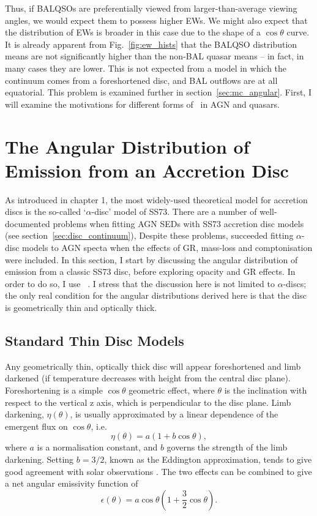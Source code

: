 Thus, if BALQSOs are preferentially viewed from larger-than-average viewing angles,
we would expect them to possess higher EWs. We might also expect that the distribution
of EWs is broader in this case due to the shape of a $\cos \theta$ curve.
It is already apparent from Fig.~\ref{fig:ew_hists} that the BALQSO distribution means 
are not significantly higher than the non-BAL quasar
means -- in fact, in many cases they are lower. 
This is not expected from a model
in which the continuum comes from a foreshortened disc, and BAL outflows are at all equatorial.
This problem is examined further in section~\ref{sec:mc_angular}. 
First, I will examine the motivations for different forms of \ept\ 
in AGN and quasars.

\section{The Angular Distribution of Emission from an Accretion Disc}
\label{sec:disc_agn}

\noindent 
As introduced in chapter 1, the most widely-used theoretical model for accretion discs
is the so-called `$\alpha$-disc' model of SS73. 
There are a number of well-documented problems when fitting 
AGN SEDs with SS73 accretion disc models (see section~\ref{sec:disc_continuum}), 
Despite these problems, \cite{capellupo2015} succeeded
fitting $\alpha$-disc models to AGN specta when the effects of
GR, mass-loss and comptonisation were included.
In this section, I start by discussing the angular distribution of
emission from a classic SS73 disc, before exploring opacity and GR 
effects. In order to do so, I use \agn\
\citep{hubeny2000,davishubeny2006,davis2007}. I stress that the 
discussion here is not limited to $\alpha$-discs; the only real condition
for the angular distributions derived here is that the 
disc is geometrically thin and optically thick.

\subsection{Standard Thin Disc Models}

\noindent
Any geometrically thin, optically thick disc will appear
foreshortened and limb darkened (if temperature decreases
with height from the central disc plane). 
Foreshortening is a simple $\cos \theta$ geometric effect, 
where $\theta$ is the inclination with respect to the vertical z axis, which
is perpendicular to the disc plane.
Limb darkening, $\eta(\theta)$, is usually approximated by a linear dependence
of the emergent flux on $\cos \theta$, i.e. 
\begin{equation}
\eta(\theta) = a \left( 1 + b \cos \theta \right),
\end{equation}
where $a$ is a normalisation constant, and $b$ governs the strength
of the limb darkening. Setting $b=3/2$, known as the Eddington approximation,
tends to give good agreement with solar observations 
\citep[e.g.][]{mihalas}. The two effects can be 
combined to give a net angular emissivity function of
\begin{equation}
\epsilon(\theta) = a \cos \theta \left( 1 + \frac{3}{2} \cos \theta \right).
\end{equation}


